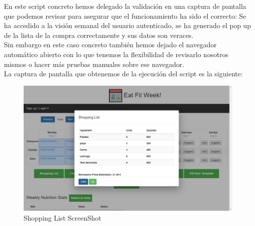 \documentclass[12pt, a4paper, twoside]{book}
\begin{document}
	En este script concreto hemos delegado la validación en una captura de pantalla que podemos revisar para asegurar que el funcionamiento ha sido el correcto: Se ha accedido a la visión semanal del usuario autenticado, se ha generado el pop up de la lista de la compra correctamente y sus datos son veraces.\\
	Sin embargo en este caso concreto también hemos dejado el navegador automático abierto con lo que tenemos la flexibilidad de revisarlo nosotros mismos o hacer más pruebas manuales sobre ese navegador.\\
	La captura de pantalla que obtenemos de la ejecución del script es la siguiente:
	\begin{figure}[H]
		\centering
		\includegraphics[width=15cm]{Imagenes/shoppingList.png}
		\caption{Shopping List ScreenShot}\label{Shopping List ScreenShot}
	\end{figure}
\end{document}
